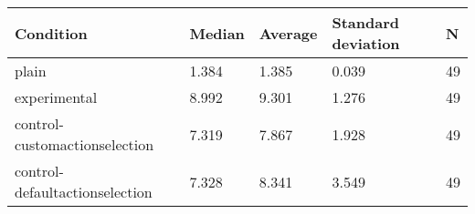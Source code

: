 \begin{center}
\begin{tabular}{|l|l|l|l|l|}
\hline
Condition & Median & Average & Standard deviation & N \\
\hline
plain & 1.384 & 1.385 & 0.039 & 49 \\
experimental & 8.992 & 9.301 & 1.276 & 49 \\
control-customactionselection & 7.319 & 7.867 & 1.928 & 49 \\
control-defaultactionselection & 7.328 & 8.341 & 3.549 & 49 \\
\hline
\end{tabular}
\end{center}
